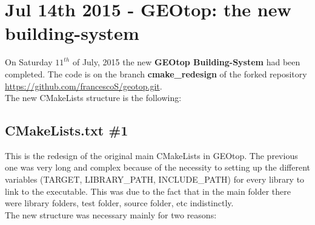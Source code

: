 \section{Jul 14th 2015 - GEOtop: the new building-system}\label{sec:20150714}

On Saturday $11^{th}$ of July, 2015 the new \textbf{GEOtop Building-System} had been completed. The code is on the branch \textbf{cmake\_redesign} of the forked repository \url{https://github.com/francescoS/geotop.git}.\\
The new CMakeLists structure is the following:

\begin{fullwidth}

\end{fullwidth}

\subsection{CMakeLists.txt \#1}

This is the redesign of the original main CMakeLists in GEOtop. The previous one was very long and complex because of the necessity to setting up the different variables (TARGET, LIBRARY\_PATH, INCLUDE\_PATH) for every library to link to the executable. This was due to the fact that in the main folder there were library folders, test folder, source folder, etc indistinctly.\\
The new structure was necessary mainly for two reasons:

